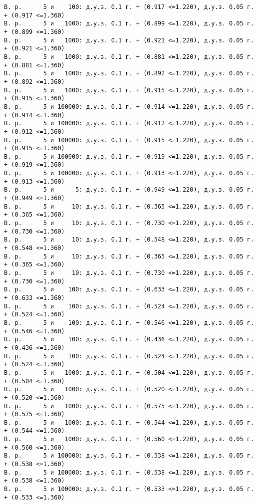 \documentclass[11pt]{article}
\begin{document}
{\begin{Verbatim}[commandchars=\\\{\}]
В. р.      5 и    100: д.у.з. 0.1 г. + (0.917 <=1.220), д.у.з. 0.05 г. + (0.917 <=1.360)
В. р.      5 и   1000: д.у.з. 0.1 г. + (0.899 <=1.220), д.у.з. 0.05 г. + (0.899 <=1.360)
В. р.      5 и   1000: д.у.з. 0.1 г. + (0.921 <=1.220), д.у.з. 0.05 г. + (0.921 <=1.360)
В. р.      5 и   1000: д.у.з. 0.1 г. + (0.881 <=1.220), д.у.з. 0.05 г. + (0.881 <=1.360)
В. р.      5 и   1000: д.у.з. 0.1 г. + (0.892 <=1.220), д.у.з. 0.05 г. + (0.892 <=1.360)
В. р.      5 и   1000: д.у.з. 0.1 г. + (0.915 <=1.220), д.у.з. 0.05 г. + (0.915 <=1.360)
В. р.      5 и 100000: д.у.з. 0.1 г. + (0.914 <=1.220), д.у.з. 0.05 г. + (0.914 <=1.360)
В. р.      5 и 100000: д.у.з. 0.1 г. + (0.912 <=1.220), д.у.з. 0.05 г. + (0.912 <=1.360)
В. р.      5 и 100000: д.у.з. 0.1 г. + (0.915 <=1.220), д.у.з. 0.05 г. + (0.915 <=1.360)
В. р.      5 и 100000: д.у.з. 0.1 г. + (0.919 <=1.220), д.у.з. 0.05 г. + (0.919 <=1.360)
В. р.      5 и 100000: д.у.з. 0.1 г. + (0.913 <=1.220), д.у.з. 0.05 г. + (0.913 <=1.360)
В. р.      5 и      5: д.у.з. 0.1 г. + (0.949 <=1.220), д.у.з. 0.05 г. + (0.949 <=1.360)
В. р.      5 и     10: д.у.з. 0.1 г. + (0.365 <=1.220), д.у.з. 0.05 г. + (0.365 <=1.360)
В. р.      5 и     10: д.у.з. 0.1 г. + (0.730 <=1.220), д.у.з. 0.05 г. + (0.730 <=1.360)
В. р.      5 и     10: д.у.з. 0.1 г. + (0.548 <=1.220), д.у.з. 0.05 г. + (0.548 <=1.360)
В. р.      5 и     10: д.у.з. 0.1 г. + (0.365 <=1.220), д.у.з. 0.05 г. + (0.365 <=1.360)
В. р.      5 и     10: д.у.з. 0.1 г. + (0.730 <=1.220), д.у.з. 0.05 г. + (0.730 <=1.360)
В. р.      5 и    100: д.у.з. 0.1 г. + (0.633 <=1.220), д.у.з. 0.05 г. + (0.633 <=1.360)
В. р.      5 и    100: д.у.з. 0.1 г. + (0.524 <=1.220), д.у.з. 0.05 г. + (0.524 <=1.360)
В. р.      5 и    100: д.у.з. 0.1 г. + (0.546 <=1.220), д.у.з. 0.05 г. + (0.546 <=1.360)
В. р.      5 и    100: д.у.з. 0.1 г. + (0.436 <=1.220), д.у.з. 0.05 г. + (0.436 <=1.360)
В. р.      5 и    100: д.у.з. 0.1 г. + (0.524 <=1.220), д.у.з. 0.05 г. + (0.524 <=1.360)
В. р.      5 и   1000: д.у.з. 0.1 г. + (0.504 <=1.220), д.у.з. 0.05 г. + (0.504 <=1.360)
В. р.      5 и   1000: д.у.з. 0.1 г. + (0.520 <=1.220), д.у.з. 0.05 г. + (0.520 <=1.360)
В. р.      5 и   1000: д.у.з. 0.1 г. + (0.575 <=1.220), д.у.з. 0.05 г. + (0.575 <=1.360)
В. р.      5 и   1000: д.у.з. 0.1 г. + (0.544 <=1.220), д.у.з. 0.05 г. + (0.544 <=1.360)
В. р.      5 и   1000: д.у.з. 0.1 г. + (0.560 <=1.220), д.у.з. 0.05 г. + (0.560 <=1.360)
В. р.      5 и 100000: д.у.з. 0.1 г. + (0.538 <=1.220), д.у.з. 0.05 г. + (0.538 <=1.360)
В. р.      5 и 100000: д.у.з. 0.1 г. + (0.538 <=1.220), д.у.з. 0.05 г. + (0.538 <=1.360)
В. р.      5 и 100000: д.у.з. 0.1 г. + (0.533 <=1.220), д.у.з. 0.05 г. + (0.533 <=1.360)

\end{Verbatim}}
\end{document}
